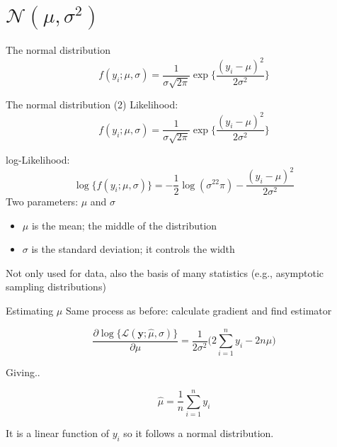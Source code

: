 \documentclass[
  ignorenonframetext,
]{beamer}
\providecommand{\tightlist}{%
  \setlength{\itemsep}{0pt}\setlength{\parskip}{0pt}}
\begin{document}
\section{\texorpdfstring{\(\mathcal{N}(\mu,\sigma^2)\)}{\textbackslash mathcal\{N\}(\textbackslash mu,\textbackslash sigma\^{}2)}}\label{mathcalnmusigma2}

\begin{frame}{The normal distribution}
\label{the-normal-distribution}
\begin{equation}
f(y_i;\mu, \sigma) = \frac{1}{\sigma\sqrt{2\pi}}\exp\biggl\{\frac{(y_i-\mu)^2}{2\sigma^2}\biggr\}
\end{equation}
\end{frame}

\begin{frame}{The normal distribution (2)}
\label{the-normal-distribution-2}
Likelihood: \begin{equation}
f(y_i;\mu, \sigma) = \frac{1}{\sigma\sqrt{2\pi}}\exp\biggl\{\frac{(y_i-\mu)^2}{2\sigma^2}\biggr\}
\end{equation}

log-Likelihood: \begin{equation}
\log\{f(y_i;\mu, \sigma)\} = -\frac{1}{2}\log(\sigma^22\pi) -\frac{(y_i-\mu)^2}{2\sigma^2}
\end{equation} Two parameters: \(\mu\) and \(\sigma\)

\begin{itemize}
\tightlist
\item
  \(\mu\) is the mean; the middle of the distribution
\item
  \(\sigma\) is the standard deviation; it controls the width
\end{itemize}

Not only used for data, also the basis of many statistics (e.g.,
asymptotic sampling distributions)
\end{frame}

\begin{frame}{Estimating \(\mu\)}
\label{estimating-mu}
Same process as before: calculate gradient and find estimator

\begin{equation}
\frac{\partial\log\{\mathcal{L}(\textbf{y};\hat{\mu},\sigma)\}}{\partial\mu} = \frac{1}{2\sigma^2}\biggl(2\sum \limits^n_{i=1}y_i-2n\mu\biggl)
\end{equation}

Giving..

\begin{equation}
\hat{\mu} = \frac{1}{n}\sum \limits^n_{i=1}y_i
\end{equation}

It is a linear function of \(y_i\) so it follows a normal distribution.
\end{frame}
\end{document}
